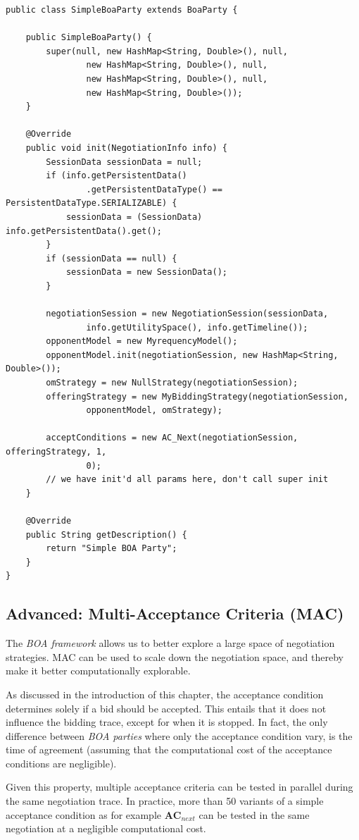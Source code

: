 \documentclass[]{llncs}
\begin{document}
\begin{lstlisting}
public class SimpleBoaParty extends BoaParty {

	public SimpleBoaParty() {
		super(null, new HashMap<String, Double>(), null,
				new HashMap<String, Double>(), null,
				new HashMap<String, Double>(), null,
				new HashMap<String, Double>());
	}

	@Override
	public void init(NegotiationInfo info) {
		SessionData sessionData = null;
		if (info.getPersistentData()
				.getPersistentDataType() == PersistentDataType.SERIALIZABLE) {
			sessionData = (SessionData) info.getPersistentData().get();
		}
		if (sessionData == null) {
			sessionData = new SessionData();
		}

		negotiationSession = new NegotiationSession(sessionData,
				info.getUtilitySpace(), info.getTimeline());
		opponentModel = new MyrequencyModel();
		opponentModel.init(negotiationSession, new HashMap<String, Double>());
		omStrategy = new NullStrategy(negotiationSession);
		offeringStrategy = new MyBiddingStrategy(negotiationSession,
				opponentModel, omStrategy);

		acceptConditions = new AC_Next(negotiationSession, offeringStrategy, 1,
				0);
		// we have init'd all params here, don't call super init
	}

	@Override
	public String getDescription() {
		return "Simple BOA Party";
	}
}
\end{lstlisting}

\subsection{Advanced: Multi-Acceptance Criteria (MAC)}
The \textit{BOA framework} allows us to better explore a large space of negotiation strategies. MAC can be used to scale down the negotiation space, and thereby make it better computationally explorable.

As discussed in the introduction of this chapter, the acceptance condition determines solely if a bid should be accepted. This entails that it does not influence the bidding trace, except for when it is stopped. In fact, the only difference between \textit{BOA parties} where only the acceptance condition vary, is the time of agreement (assuming that the computational cost of the acceptance conditions are negligible).

Given this property, multiple acceptance criteria can be tested in parallel during the same negotiation trace. In practice, more than 50 variants of a simple acceptance condition as for example $\textbf{AC}_{next}$ can be tested in the same negotiation at a negligible computational cost.
\end{document}
